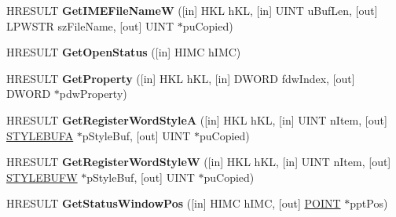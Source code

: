 \begin{DoxyCompactItemize}
\item 
\mbox{\label{interface_i_active_i_m_m_app_ad54f4093bc56dcb5afa92423d1e215b9}} 
H\+R\+E\+S\+U\+LT {\bfseries Get\+I\+M\+E\+File\+NameW} (\mbox{[}in\mbox{]} H\+KL h\+KL, \mbox{[}in\mbox{]} U\+I\+NT u\+Buf\+Len, \mbox{[}out\mbox{]} L\+P\+W\+S\+TR sz\+File\+Name, \mbox{[}out\mbox{]} U\+I\+NT $\ast$pu\+Copied)
\item 
\mbox{\label{interface_i_active_i_m_m_app_adb493e7ee79b6eb11890530b06506ebb}} 
H\+R\+E\+S\+U\+LT {\bfseries Get\+Open\+Status} (\mbox{[}in\mbox{]} H\+I\+MC h\+I\+MC)
\item 
\mbox{\label{interface_i_active_i_m_m_app_ae31df7fc28ab8a52065adeea99b2d7ef}} 
H\+R\+E\+S\+U\+LT {\bfseries Get\+Property} (\mbox{[}in\mbox{]} H\+KL h\+KL, \mbox{[}in\mbox{]} D\+W\+O\+RD fdw\+Index, \mbox{[}out\mbox{]} D\+W\+O\+RD $\ast$pdw\+Property)
\item 
\mbox{\label{interface_i_active_i_m_m_app_ac9b292932ed6623daced3654bda5128d}} 
H\+R\+E\+S\+U\+LT {\bfseries Get\+Register\+Word\+StyleA} (\mbox{[}in\mbox{]} H\+KL h\+KL, \mbox{[}in\mbox{]} U\+I\+NT n\+Item, \mbox{[}out\mbox{]} \hyperlink{struct_s_t_y_l_e_b_u_f_a}{S\+T\+Y\+L\+E\+B\+U\+FA} $\ast$p\+Style\+Buf, \mbox{[}out\mbox{]} U\+I\+NT $\ast$pu\+Copied)
\item 
\mbox{\label{interface_i_active_i_m_m_app_abfbfa5944bf39e0cf12ba91eb65bca08}} 
H\+R\+E\+S\+U\+LT {\bfseries Get\+Register\+Word\+StyleW} (\mbox{[}in\mbox{]} H\+KL h\+KL, \mbox{[}in\mbox{]} U\+I\+NT n\+Item, \mbox{[}out\mbox{]} \hyperlink{struct_s_t_y_l_e_b_u_f_w}{S\+T\+Y\+L\+E\+B\+U\+FW} $\ast$p\+Style\+Buf, \mbox{[}out\mbox{]} U\+I\+NT $\ast$pu\+Copied)
\item 
\mbox{\label{interface_i_active_i_m_m_app_af5da5d47f4f31ac568de279799d40a23}} 
H\+R\+E\+S\+U\+LT {\bfseries Get\+Status\+Window\+Pos} (\mbox{[}in\mbox{]} H\+I\+MC h\+I\+MC, \mbox{[}out\mbox{]} \hyperlink{structtag_p_o_i_n_t}{P\+O\+I\+NT} $\ast$ppt\+Pos)
\item 
\mbox{\label{interface_i_active_i_m_m_app_a5542cb388c5b23e4c4f1fb69ec844f9e}} 

\end{DoxyCompactItemize}
